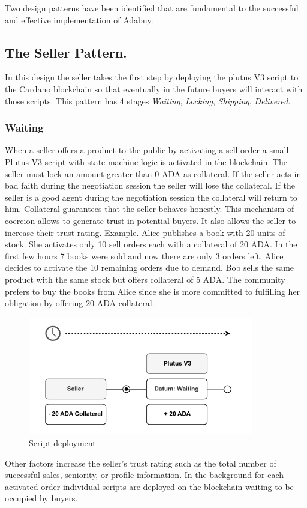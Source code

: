 \documentclass[12pt]{article}
\begin{document}
Two design patterns have been identified that are fundamental to the successful and effective implementation of Adabuy.

\subsection { The Seller Pattern. } 

In this design the seller takes the first step by deploying the plutus V3 script to the Cardano blockchain so that eventually in the future buyers will interact with those scripts. This pattern has 4 stages \emph{Waiting}, \emph{Locking}, \emph{Shipping}, \emph{Delivered}.

\subsubsection { Waiting }

When a seller offers a product to the public by activating a sell order a small Plutus V3 script with state machine logic is activated in the blockchain.
The seller must lock an amount greater than 0 ADA as collateral. 
If the seller acts in bad faith during the negotiation session the seller will lose the collateral.
If the seller is a good agent during the negotiation session the collateral will return to him.
Collateral guarantees that the seller behaves honestly.
This mechanism of coercion allows to generate trust in potential buyers. 
It also allows the seller to increase their trust rating. Example. Alice publishes a book with 20 units of stock.
She activates only 10 sell orders each with a collateral of 20 ADA.
In the first few hours 7 books were sold and now there are only 3 orders left.
Alice decides to activate the 10 remaining orders due to demand.
Bob sells the same product with the same stock but offers collateral of 5 ADA. The community prefers to buy the books from Alice since she is more committed to fulfilling her obligation by offering 20 ADA collateral.

\begin{figure}[ht]
  \centering
  \includegraphics[width=0.88\textwidth, keepaspectratio]{1.pdf}
  \caption{Script deployment}
  \label{fig:mi_imagen}
\end{figure}
Other factors increase the seller's trust rating such as the total number of successful sales, seniority, or profile information.
In the background for each activated order individual scripts are deployed on the blockchain waiting to be occupied by buyers.
\\
\\
\\
\end{document}
